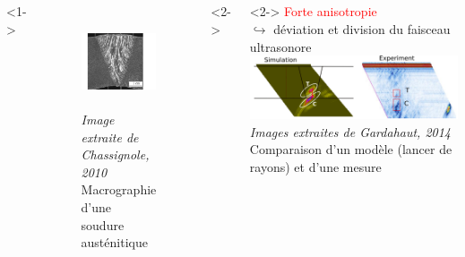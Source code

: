 \documentclass[10pt,xcolor=x11names,compress, notes=show]{beamer}%
\begin{document}
\subsection*{}
\begin{frame}{\insertsectionhead}
\vspace{-0.5cm}
\hspace{1cm}
	\begin{columns}[c]
			<1->
			\centering
			\begin{figure}
				\includegraphics[height=2.7cm]{./img/soudure1.png}\\
				{\tiny{ \itshape Image extraite de Chassignole, 2010} \\ \centering \scriptsize Macrographie d'une soudure austénitique  }
			\end{figure}
			<2->
			\hspace{-3cm}
			\vspace{2cm}
			<2->
			\hspace{-1cm}
			\textcolor{red}{Forte anisotropie}\\
			$\hookrightarrow$ déviation et division du faisceau ultrasonore\\[0.2cm]
			\hspace{-0.5cm}
			\includegraphics[scale=0.5]{img/gardahaut.png}\\
			{\tiny{ \itshape Images extraites de Gardahaut, 2014} \\ \centering \scriptsize Comparaison d'un modèle (lancer de rayons) et d'une mesure }
				

\end{columns}
\end{frame}
\end{document}
